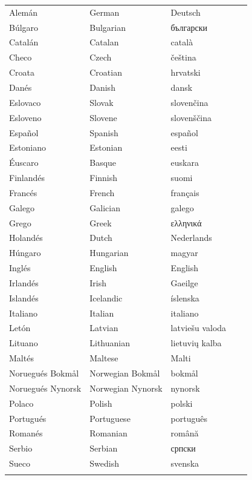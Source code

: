 \vspace*{-5mm}
\centering
  \setlength{\tabcolsep}{2em}
  \begin{tabularx}{\textwidth}{lllll} \toprule\addlinespace
  Alemán & German & Deutsch\\
  Búlgaro & Bulgarian & български \\
  Catalán & Catalan & català\\
  Checo & Czech & čeština\\
  Croata & Croatian & hrvatski\\
  Danés & Danish & dansk\\
  Eslovaco & Slovak & slovenčina\\
  Esloveno & Slovene & slovenščina\\
  Español & Spanish & español\\
  Estoniano & Estonian & eesti\\
  Éuscaro & Basque & euskara\\
  Finlandés & Finnish & suomi\\
  Francés & French & français\\
  Galego & Galician & galego\\
  Grego & Greek & ελληνικά\\
  Holandés & Dutch & Nederlands\\
  Húngaro & Hungarian & magyar\\ 
  Inglés & English & English\\
  Irlandés & Irish & Gaeilge\\
  Islandés & Icelandic & íslenska\\
  Italiano & Italian & italiano\\
  Letón & Latvian & latviešu valoda\\
  Lituano & Lithuanian & lietuvių kalba\\
  Maltés & Maltese & Malti\\
  Noruegués Bokmål & Norwegian Bokmål & bokmål\\
  Noruegués Nynorsk & Norwegian Nynorsk & nynorsk\\
  Polaco & Polish & polski\\
  Portugués & Portuguese & português\\
  Romanés & Romanian & română\\
  Serbio & Serbian & српски\\
  Sueco & Swedish & svenska\\  \addlinespace \bottomrule
\end{tabularx}
